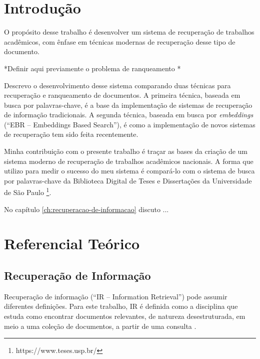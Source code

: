 \documentclass[
	12pt,				%
	openright,			%
	oneside,			%
	a4paper,			%
	english,			%
	french,				%
	spanish,			%
	brazil				%
	]{abntex2}
\begin{document}
\textual

\chapter*[Introdução]{Introdução}
\label{chap:intro}




O propósito desse trabalho é desenvolver um sistema de recuperação de trabalhos acadêmicos, com ênfase em técnicas modernas
de recuperação desse tipo de documento.

*Definir aqui previamente o problema de ranqueamento *

Descrevo o desenvolvimento desse sistema comparando duas técnicas para recuperação e ranqueamento de documentos.
A primeira técnica, baseada em busca por palavras-chave, é a base da implementação de sistemas de recuperação de informação tradicionais.
A segunda técnica, baseada em busca por \textit{embeddings} (``EBR -- Embeddings Based Search''), é como a implementação de novos sistemas de recuperação
tem sido feita recentemente.

Minha contribuição com o presente trabalho é traçar as bases da criação de um sistema moderno de recuperação de trabalhos acadêmicos nacionais.
A forma que utilizo para medir o sucesso do meu sistema é compará-lo com o sistema de busca por palavras-chave da Biblioteca Digital
de Teses e Dissertações da Universidade de São Paulo \footnote{https://www.teses.usp.br/}.

No capítulo \ref{ch:recuperacao-de-informacao} discuto ...


\chapter{Referencial Teórico}\label{ch:sistemas-de-recuperacao-de-informacao}

\section{Recuperação de Informação}\label{sec:sobre-recuperacao-de-informacao}

Recuperação de informação (``IR -- Information Retrieval'') pode assumir diferentes definições.
Para este trabalho, IR é definida como a disciplina que estuda como encontrar documentos relevantes, de natureza desestruturada, em meio a uma coleção de documentos, a
partir de uma consulta \cite{manning2008introduction}.
\end{document}
